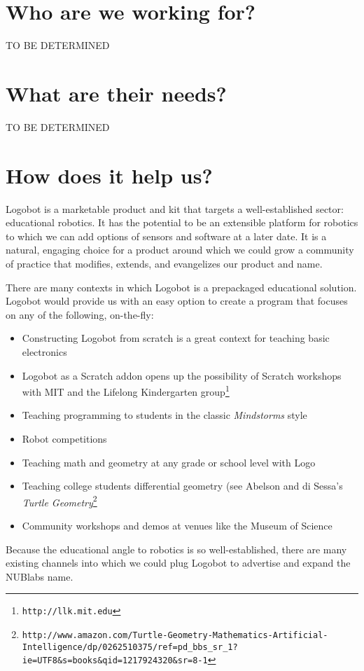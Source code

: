 \documentclass[11pt]{article}
\begin{document}
\section{Who are we working for?}
TO BE DETERMINED

\section{What are their needs?}
TO BE DETERMINED

\section{How does it help us?}
Logobot is a marketable product and kit that targets a well-established sector: educational robotics.  It has the potential to be an extensible platform for robotics to which we can add options of sensors and software at a later date.  It is a natural, engaging choice for a product around which we could grow a community of practice that modifies, extends, and evangelizes our product and name.

There are many contexts in which Logobot is a prepackaged educational solution.  Logobot would provide us with an easy option to create a program that focuses on any of the following, on-the-fly:
\begin{itemize}
\item Constructing Logobot from scratch is a great context for teaching basic electronics
\item Logobot as a Scratch addon opens up the possibility of Scratch workshops with MIT and the Lifelong Kindergarten group\footnote{\texttt{http://llk.mit.edu}}
\item Teaching programming to students in the classic \textit{Mindstorms} style
\item Robot competitions
\item Teaching math and geometry at any grade or school level with Logo
\item Teaching college students differential geometry (see Abelson and di Sessa's \textit{Turtle Geometry}\footnote{\texttt{http://www.amazon.com/Turtle-Geometry-Mathematics-Artificial-Intelligence/dp/0262510375/ref=pd\_bbs\_sr\_1?ie=UTF8\&s=books\&qid=1217924320\&sr=8-1}}
\item Community workshops and demos at venues like the Museum of Science
\end{itemize}
 Because the educational angle to robotics is so well-established, there are many existing channels into which we could plug Logobot to advertise and expand the NUBlabs name.
\end{document}
